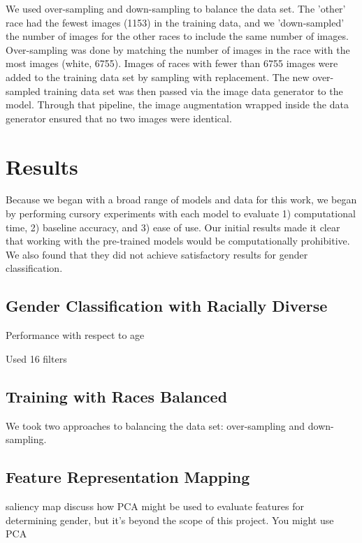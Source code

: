 \documentclass[obeyspaces, spaces, fleqn,10pt]{SelfArx} %
\begin{document}
We used over-sampling and down-sampling to balance the data set. The 'other' race had the fewest images (1153) in the training data, and we 'down-sampled' the number of images for the other races to include the same number of images. Over-sampling was done by matching the number of images in the race with the most images (white, 6755). Images of races with fewer than 6755 images were added to the training data set by sampling with replacement. The new over-sampled training data set was then passed via the image data generator to the model. Through that pipeline, the image augmentation wrapped inside the data generator ensured that no two images were identical. 


\section{Results}

Because we began with a broad range of models and data for this work, we began by performing cursory experiments with each model to evaluate 1) computational time, 2) baseline accuracy, and 3) ease of use. Our initial results made it clear that working with the pre-trained models would be computationally prohibitive. We also found that they did not achieve satisfactory results for gender classification. 

\subsection{Gender Classification with Racially Diverse}
Performance with respect to age



Used 16 filters 
\lipsum[11] %

\subsection{Training with Races Balanced}

We took two approaches to balancing the data set: over-sampling and down-sampling. 
\lipsum[11] %


\lipsum[11] %
\subsection{Feature Representation Mapping}
\lipsum[11] %


saliency map
discuss how PCA might be used to evaluate features for determining gender, but it's beyond the scope of this project. You might use PCA 
\end{document}
